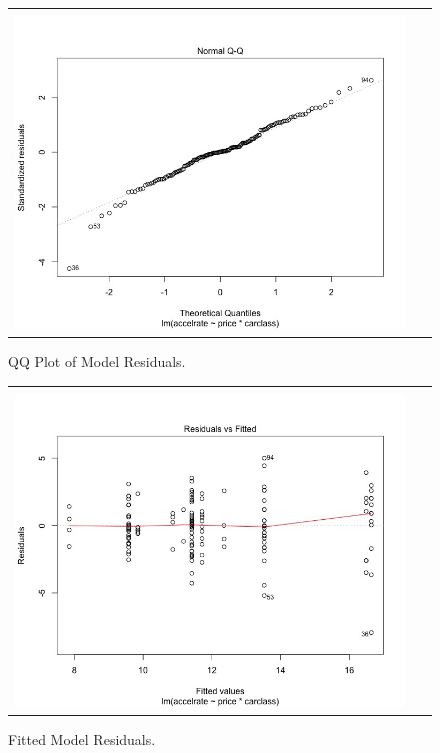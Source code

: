 \documentclass[acmsmall]{acmart}
\begin{document}
\begin{figure}[H] %
	\centering
	\begin{tabular}{| p{}|}
	\hline
	\\
	\includegraphics[width=0.95\textwidth]{../graphics/TWAqq}\\
	\hline
	\end{tabular}	
	\caption{QQ Plot of Model Residuals.} %
	\label{fig:TWAQQ}
\end{figure}

\begin{figure}[H] %
	\centering
	\begin{tabular}{| p{}|}
	\hline
	\\
	\includegraphics[width=0.95\textwidth]{../graphics/TWAresid}\\
	\hline
	\end{tabular}	
	\caption{Fitted Model Residuals.} %
	\label{fig:TWARES}
\end{figure}
\end{document}
